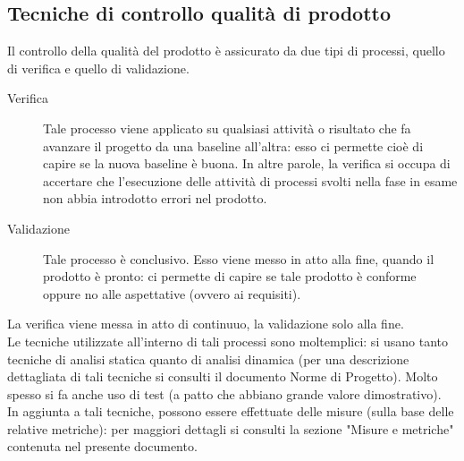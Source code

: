	\subsection{Tecniche di controllo qualità di prodotto}
		Il controllo della qualità del prodotto è assicurato da due tipi di processi, quello di verifica e quello di validazione.
		\begin{description}
			\item[Verifica] Tale processo viene applicato su qualsiasi attività o risultato che fa avanzare il progetto da una baseline all'altra: esso 
			ci permette cioè di capire se la nuova baseline è buona. In altre parole, la verifica si occupa di accertare che l'esecuzione delle attività 
			di processi svolti nella fase in esame non abbia introdotto errori nel prodotto.
			\item[Validazione] Tale processo è conclusivo. Esso viene messo in atto alla fine, quando il prodotto è pronto: ci permette di capire se tale 
			prodotto è conforme oppure no alle aspettative (ovvero ai requisiti).
		\end{description}
		La verifica viene messa in atto di continuuo, la validazione solo alla fine.\\
		Le tecniche utilizzate all'interno di tali processi sono moltemplici: si usano tanto tecniche di analisi statica quanto di analisi dinamica (per 
		una descrizione dettagliata di tali tecniche si consulti il documento Norme di Progetto). Molto spesso si fa anche uso di test (a patto che 
		abbiano grande valore dimostrativo).\\
		In aggiunta a tali tecniche, possono essere effettuate delle misure (sulla base delle relative metriche): per maggiori dettagli si consulti la 
		sezione "Misure e metriche" contenuta nel presente documento.
